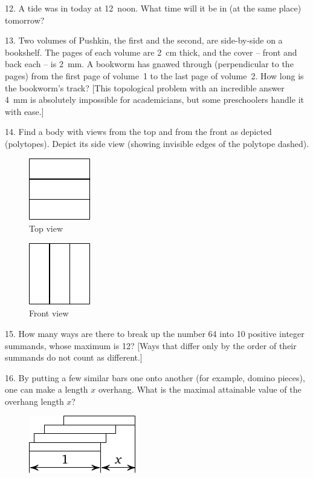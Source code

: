 \begin{problem}{12.}
	A tide was in today at 12~noon. What time will it be in (at the same place) tomorrow?
\end{problem}

\begin{problem}{13.}
	Two volumes of Pushkin, the first and the second, are side-by-side on a bookshelf. The pages of each
	volume are \SI{2}{\cm} thick, and the cover -- front and back each -- is \SI{2}{\mm}. A bookworm has gnawed through
	(perpendicular to the pages) from the first page of volume~1 to the last page of volume~2. How long is the bookworm's track? [This topological problem with an incredible answer \SI{4}{\mm} is absolutely impossible for academicians,
	but some preschoolers handle it with ease.]
\end{problem}

\begin{problem}{14.}
	Find a body with views from the top and from the front as depicted (polytopes).
	Depict its side view (showing invisible edges of the polytope dashed).
	\begin{figure}
		\footnotesize
		\null\hfill
		\parbox{0.2\linewidth}{\centering\includegraphics{taskbook-99}\\Top view}
		\hfill
		\parbox{0.2\linewidth}{\centering\includegraphics{taskbook-98}\\Front view}
		\hfill\null
	\end{figure}
\end{problem}

\begin{problem}{15.}
	How many ways are there to break up the number 64 into 10 positive integer summands, whose maximum is 12? [Ways that differ only by the order of their summands do not count as different.]
\end{problem}

\begin{problem}{16.}
	By putting a few similar bars one onto another (for example, domino pieces),
	one can make a length $x$ overhang. What is the maximal attainable value of the overhang length $x$?
	\begin{figure}
		\includegraphics{taskbook-97}
	\end{figure}
\end{problem}

